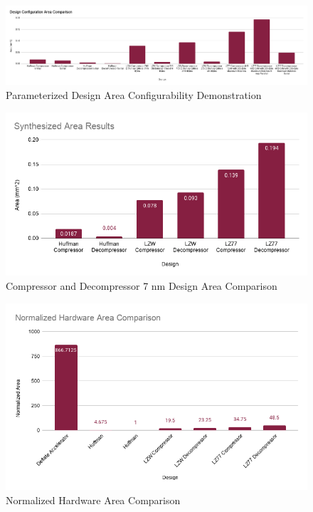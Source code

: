\documentclass[doublespace,nopageskip]{VTthesis}
\begin{document}
\begin{figure}[htb]
	\centering
	\includegraphics[scale=0.285]{Design Configuration Area Comparison.png}
	\caption{Parameterized Design Area Configurability Demonstration}
	\label{fig:design_configuration_area_comparison}
\end{figure}
\begin{figure}[htb]
	\centering
	\includegraphics[scale=0.6]{Synthesized Area Results.png}
	\caption{Compressor and Decompressor 7 nm Design Area Comparison}
	\label{fig:synthesized_area_results}
\end{figure}
\begin{figure}[htb]
	\centering
	\includegraphics[scale=0.6]{Normalized Hardware Area Comparison.png}
	\caption{Normalized Hardware Area Comparison}
	\label{fig:normalized_hardware_area_comparison}
\end{figure}
\end{document}
